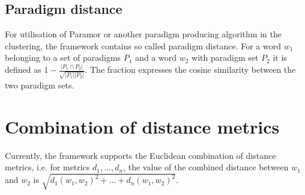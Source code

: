 \subsection{Paradigm distance}\label{section:pdgm_dist}
For utilisation of Paramor or another paradigm producing algorithm in the clustering, the framework contains so called paradigm distance. For a word $w_1$ belonging to a set of paradigms $P_1$ and a word $w_2$ with paradigm set $P_2$ it is defined as $ 1 - \frac{\left| P_1 \cap P_2 \right| }{\sqrt{|P_1| |P_2|}} $. The fraction expresses the cosine similarity between the two paradigm sets.

\section{Combination of distance metrics}
Currently, the framework supports the Euclidean combination of distance metrics, i.e. for metrics $d_1, \ldots, d_n$, the value of the combined distance between $w_1$ and $w_2$ is $\sqrt{d_1(w_1, w_2)^2 + \ldots + d_n(w_1, w_2)^2}$.
